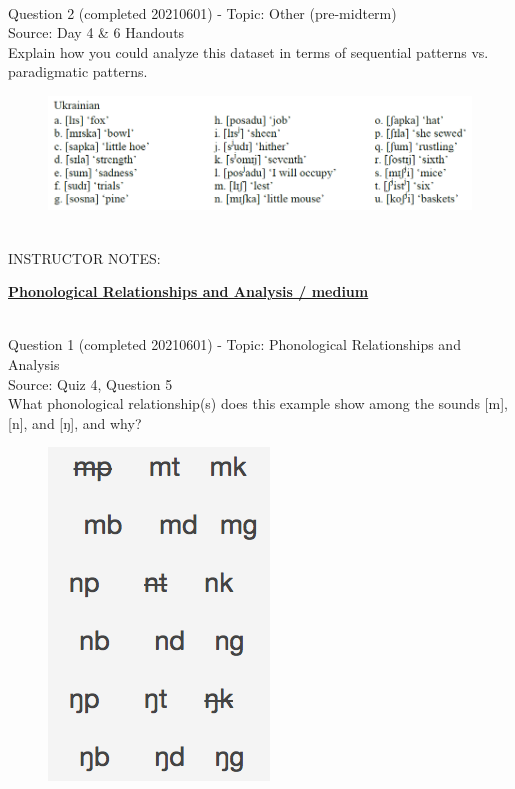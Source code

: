 \documentclass[12pt]{article}
\begin{document}
~\\

{\large Question 2} (completed 20210601) - Topic: Other (pre-midterm)\\
Source: Day 4 \& 6 Handouts\\

Explain how you could analyze this dataset in terms of sequential patterns vs. paradigmatic patterns.\\

\begin{figure}[H]
\includegraphics{../images/ukrainian.png}
\end{figure}

~\\
INSTRUCTOR NOTES: 


\newpage\textbf{\underline{\huge Phonological Relationships and Analysis / medium\\}}

~\\

{\large Question 1} (completed 20210601) - Topic: Phonological Relationships and Analysis\\
Source: Quiz 4, Question 5\\

What phonological relationship(s) does this example show among the sounds [m], [n], and [ŋ], and why?\\

\begin{figure}[H]
\includegraphics{../images/quiz4question5_d.png}
\end{figure}
\end{document}
